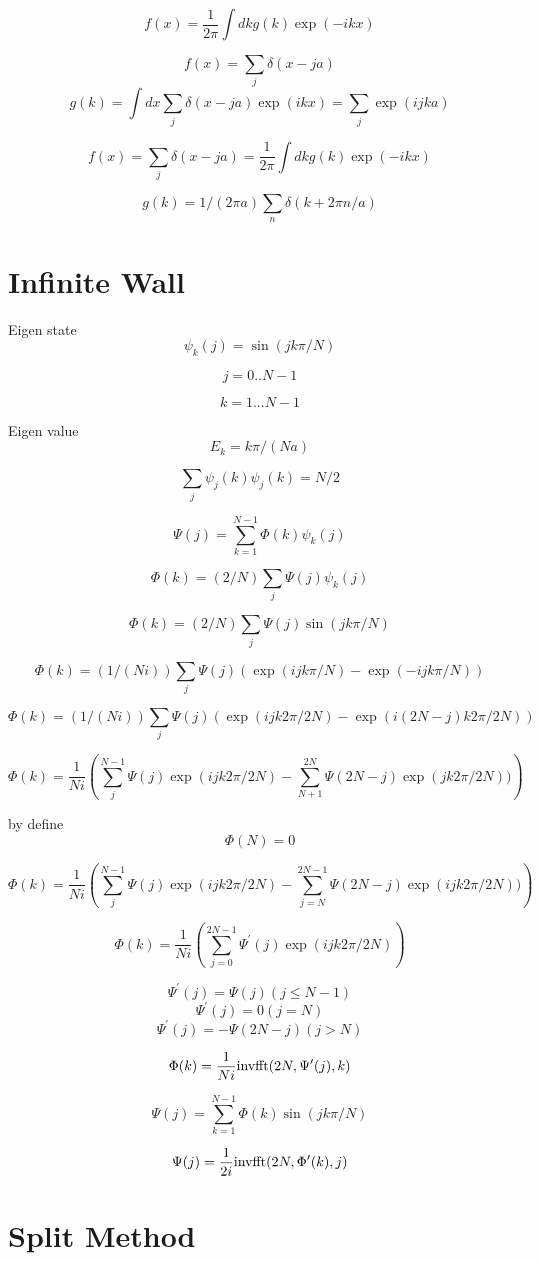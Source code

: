 \documentclass[12pt,twoside]{article}
\begin{document}
$$
f(x) = \frac{1}{2\pi}\int dk g(k) \exp(-ikx)
$$

$$
f(x) = \sum_j \delta(x - ja)
$$
$$
g(k) = \int dx \sum_j \delta(x - ja) \exp(ikx) = \sum_j \exp(ijka)
$$

$$
f(x) = \sum_j \delta(x - ja) = \frac{1}{2\pi}\int dk g(k) \exp(-ikx)
$$

$$
g(k) = 1/(2\pi a)\sum_n \delta(k+2\pi n/a)
$$


\section{Infinite Wall}

Eigen state
$$
\psi_k(j) = \sin(jk\pi/N)
$$

$$
j=0..N-1
$$

$$
k=1...N-1
$$

Eigen value
$$
E_k = k\pi/(N a)
$$

$$
\sum_j \psi_j(k)\psi_j(k) = N/2
$$

$$
\Psi(j) = \sum_{k=1}^{N-1} \Phi(k) \psi_k(j)
$$

$$
\Phi(k) = (2/N) \sum_j \Psi(j) \psi_k(j)
$$

$$
\Phi(k) = (2/N) \sum_j \Psi(j) \sin(jk\pi/N)
$$

$$
\Phi(k) = (1/(Ni)) \sum_j \Psi(j) (\exp(ijk\pi/N) - \exp(-ijk\pi/N))
$$

$$
\Phi(k) = (1/(Ni)) \sum_j \Psi(j) (\exp(ijk2\pi/2N) - \exp(i(2N-j)k2\pi/2N))
$$

$$
\Phi(k) = \frac{1}{Ni}\left(\sum_j^{N-1} \Psi(j)\exp(ijk2\pi/2N) - \sum_{N+1}^{2N} \Psi(2N-j)\exp(jk2\pi/2N))\right)
$$

by define
$$
\Phi(N)=0
$$

$$
\Phi(k) = \frac{1}{Ni}\left(\sum_j^{N-1} \Psi(j)\exp(ijk2\pi/2N) - \sum_{j=N}^{2N-1} \Psi(2N-j)\exp(ijk2\pi/2N))\right)
$$

$$
\Phi(k) = \frac{1}{Ni}\left(\sum_{j=0}^{2N-1} \Psi^\prime(j)\exp(ijk2\pi/2N)\right)
$$

$$
\Psi^\prime(j) = \Psi(j) (j \le N-1)
$$
$$
\Psi^\prime(j) = 0 (j = N)
$$
$$
\Psi^\prime(j) = -\Psi(2N-j) (j > N)
$$

$$
\Phi(k) = \frac{1}{Ni} {\rm inv fft}(2N, \Psi^\prime(j), k)
$$


$$
\Psi(j) = \sum_{k=1}^{N-1} \Phi(k) \sin(jk\pi/N)
$$

$$
\Psi(j) = \frac{1}{2i} {\rm inv fft}(2N, \Phi^\prime(k), j)
$$

\section{Split Method}
\end{document}
